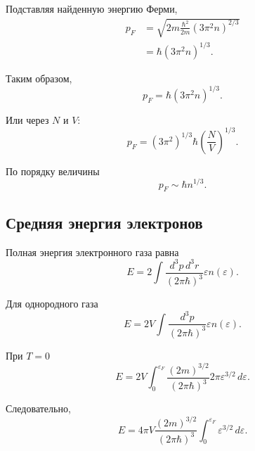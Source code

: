 \documentclass[../final.tex]{subfiles}
\begin{document}
Подставляя найденную энергию Ферми,
%
\begin{align*}
    p_F
    &=
    \sqrt{
        2m
        \frac{\hbar^2}{2m}
        (3\pi^2n)^{2/3}
    }
    \\[3pt]
    &=
    \hbar
    (3\pi^2n)^{1/3}.
\end{align*}

Таким образом,
%
\begin{equation*}
    \boxed{
        p_F
        =
        \hbar
        (3\pi^2n)^{1/3}
    }.
\end{equation*}

Или через $N$ и $V$:
%
\begin{equation*}
    \boxed{
        p_F
        =
        (3\pi^2)^{1/3}
        \hbar
        \left(
            \frac{N}{V}
        \right)^{1/3}
    }.
\end{equation*}

По порядку величины
%
\begin{equation*}
    p_F
    \sim
    \hbar n^{1/3}.
\end{equation*}



\subsection*{Средняя энергия электронов}

Полная энергия электронного газа равна
%
\begin{equation*}
    E
    =
    2
    \int
    \frac{
        d^3p\,d^3r
    }{
        (2\pi\hbar)^3
    }
    \varepsilon
    n(\varepsilon).
\end{equation*}

Для однородного газа
%
\begin{equation*}
    E
    =
    2V
    \int
    \frac{
        d^3p
    }{
        (2\pi\hbar)^3
    }
    \varepsilon
    n(\varepsilon).
\end{equation*}

При $T=0$
%
\begin{equation*}
    E
    =
    2V
    \int_0^{\varepsilon_F}
    \frac{
        (2m)^{3/2}
    }{
        (2\pi\hbar)^3
    }
    2\pi
    \varepsilon^{3/2}\,d\varepsilon.
\end{equation*}

Следовательно,
%
\begin{equation*}
    E
    =
    4\pi V
    \frac{
        (2m)^{3/2}
    }{
        (2\pi\hbar)^3
    }
    \int_0^{\varepsilon_F}
    \varepsilon^{3/2}\,d\varepsilon.
\end{equation*}
\end{document}
